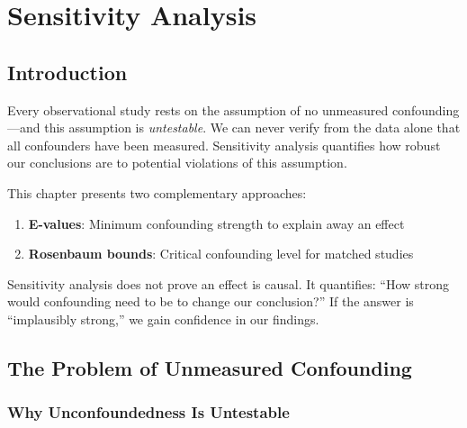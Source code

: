 \chapter{Sensitivity Analysis}
\label{ch:sensitivity}


\section{Introduction}
\label{sec:sens_intro}

Every observational study rests on the assumption of no unmeasured confounding---and this assumption is \emph{untestable}. We can never verify from the data alone that all confounders have been measured. Sensitivity analysis quantifies how robust our conclusions are to potential violations of this assumption.

This chapter presents two complementary approaches:
\begin{enumerate}
    \item \textbf{E-values}: Minimum confounding strength to explain away an effect
    \item \textbf{Rosenbaum bounds}: Critical confounding level for matched studies
\end{enumerate}

\begin{insight}
Sensitivity analysis does not prove an effect is causal. It quantifies: ``How strong would confounding need to be to change our conclusion?'' If the answer is ``implausibly strong,'' we gain confidence in our findings.
\end{insight}

\section{The Problem of Unmeasured Confounding}
\label{sec:unmeasured}

\subsection{Why Unconfoundedness Is Untestable}

